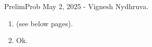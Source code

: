 

\begin{center}
	PrelimProb May 2, 2025 - Vignesh Nydhruva. 
\end{center}

\begin{enumerate}
	\item (see below pages). 
	\item Ok. 
\end{enumerate}


